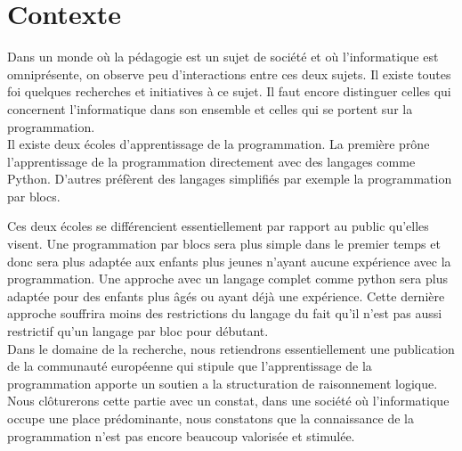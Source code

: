 \section{Contexte}
\label{intro-context}
Dans un monde où la pédagogie est un sujet de société et où l'informatique est omniprésente, on observe peu d'interactions entre ces deux sujets. Il existe toutes foi quelques recherches et initiatives à ce sujet. Il faut encore distinguer celles qui concernent l'informatique dans son ensemble et celles qui se portent sur la programmation.\\

Il existe deux écoles d'apprentissage de la programmation. La première prône l'apprentissage de la programmation directement avec des langages comme Python. D'autres préfèrent des langages simplifiés par exemple la programmation par blocs. 

Ces deux écoles se différencient essentiellement par rapport au public qu'elles visent. Une programmation par blocs sera plus simple dans le premier temps et donc sera plus adaptée aux enfants plus jeunes n'ayant aucune expérience avec la programmation. Une approche avec un langage complet comme python sera plus adaptée pour des enfants plus âgés ou ayant déjà une expérience. Cette dernière approche souffrira moins des restrictions du langage du fait qu'il n'est pas aussi restrictif qu'un langage par bloc pour débutant.\\

Dans le domaine de la recherche, nous retiendrons essentiellement une publication de la communauté européenne qui stipule que l'apprentissage de la programmation apporte un soutien a la structuration de raisonnement logique.\\

Nous clôturerons cette partie avec un constat, dans une société où l'informatique occupe une place prédominante, nous constatons que la connaissance de la programmation n'est pas encore beaucoup valorisée et stimulée. 
